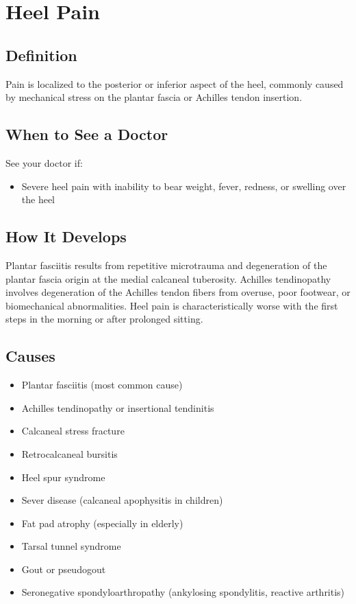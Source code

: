 \chapter{Heel Pain}

\section*{Definition}
Pain is localized to the posterior or inferior aspect of the heel, commonly caused by mechanical stress on the plantar fascia or Achilles tendon insertion.

\section*{When to See a Doctor}
See your doctor if:
\begin{itemize}
  \item Severe heel pain with inability to bear weight, fever, redness, or swelling over the heel
\end{itemize}

\section*{How It Develops}
Plantar fasciitis results from repetitive microtrauma and degeneration of the plantar fascia origin at the medial calcaneal tuberosity. Achilles tendinopathy involves degeneration of the Achilles tendon fibers from overuse, poor footwear, or biomechanical abnormalities. Heel pain is characteristically worse with the first steps in the morning or after prolonged sitting.

\section*{Causes}
\begin{itemize}
  \item Plantar fasciitis (most common cause)
  \item Achilles tendinopathy or insertional tendinitis
  \item Calcaneal stress fracture
  \item Retrocalcaneal bursitis
  \item Heel spur syndrome
  \item Sever disease (calcaneal apophysitis in children)
  \item Fat pad atrophy (especially in elderly)
  \item Tarsal tunnel syndrome
  \item Gout or pseudogout
  \item Seronegative spondyloarthropathy (ankylosing spondylitis, reactive arthritis)
\end{itemize}

